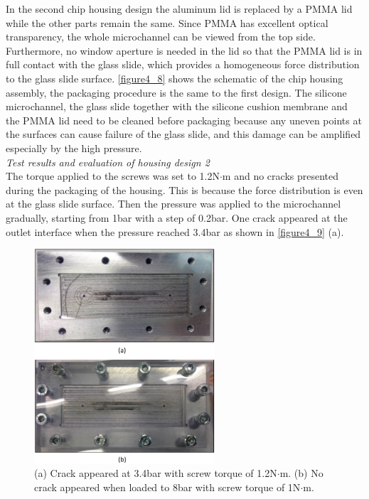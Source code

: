 In the second chip housing design the aluminum lid is replaced by a PMMA lid while the other parts remain the same. Since PMMA has excellent optical transparency, the whole microchannel can be viewed from the top side. Furthermore, no window aperture is needed in the lid so that the PMMA lid is in full contact with the glass slide, which provides a homogeneous force distribution to the glass slide surface. \autoref{figure4_8} shows the schematic of the chip housing assembly, the packaging procedure is the same to the first design. The silicone microchannel, the glass slide together with the silicone cushion membrane and the PMMA lid need to be cleaned before packaging because any uneven points at the surfaces can cause failure of the glass slide, and this damage can be amplified especially by the high pressure.\\

\noindent \textit{Test results and evaluation of housing design 2}\\

The torque applied to the screws was set to 1.2N$\cdot$m and no cracks presented during the packaging of the housing. This is because the force distribution is even at the glass slide surface. Then the pressure was applied to the microchannel gradually, starting from 1bar with a step of 0.2bar.  One crack appeared at the outlet interface when the pressure reached 3.4bar as shown in \autoref{figure4_9} (a). 

\begin{figure}[!h]%
\centering
\includegraphics[width=0.6\textwidth]{figures/packagingandtestunderhighpressure/figure4_9}%
\caption{(a) Crack appeared at 3.4bar with screw torque of 1.2N$\cdot$m. (b) No crack appeared when loaded to 8bar with screw torque of 1N$\cdot$m.}%
\label{figure4_9}%
\end{figure}

